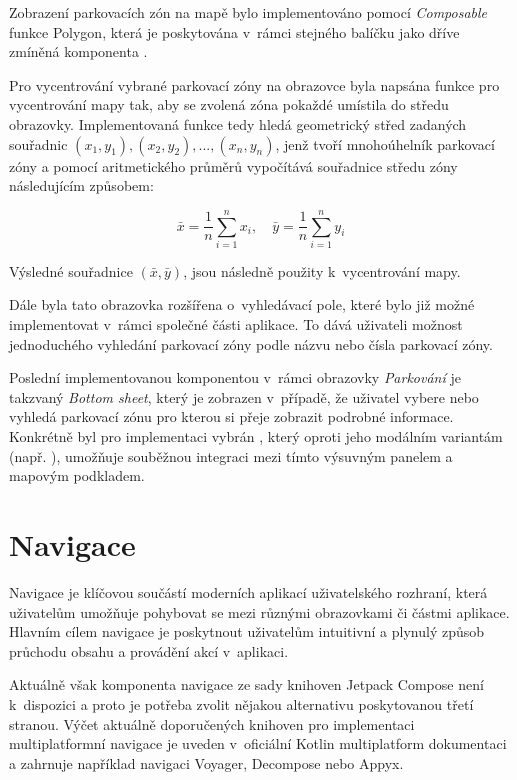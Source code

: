 Zobrazení parkovacích zón na mapě bylo implementováno pomocí \textit{Composable} funkce Polygon, která je poskytována v~rámci stejného balíčku 
jako dříve zmíněná komponenta .

Pro vycentrování vybrané parkovací zóny na obrazovce byla napsána funkce pro vycentrování mapy tak, aby se zvolená zóna pokaždé 
umístila do středu obrazovky. Implementovaná funkce tedy hledá geometrický střed zadaných souřadnic \( (x_1, y_1), (x_2, y_2), ..., (x_n, y_n)\), 
jenž tvoří mnohoúhelník parkovací zóny a pomocí aritmetického průměrů vypočítává souřadnice středu zóny následujícím způsobem:

\[
\bar{x} = \frac{1}{n} \sum_{i=1}^{n} x_i, \quad \bar{y} = \frac{1}{n} \sum_{i=1}^{n} y_i
\]

Výsledné souřadnice $(\bar{x},\bar{y})$, jsou následně použity k~vycentrování mapy.

\bigskip

Dále byla tato obrazovka rozšířena o~vyhledávací pole, které bylo již možné implementovat v~rámci společné části aplikace. 
To dává uživateli možnost jednoduchého vyhledání parkovací zóny podle názvu nebo čísla parkovací zóny.

Poslední implementovanou komponentou v~rámci obrazovky \textit{Parkování} je takzvaný \textit{Bottom sheet}, který je zobrazen v~případě, 
že uživatel vybere nebo vyhledá parkovací zónu pro kterou si přeje zobrazit podrobné informace. Konkrétně byl pro implementaci vybrán 
, který oproti jeho modálním variantám (např. ), umožňuje souběžnou integraci mezi tímto
 výsuvným panelem a mapovým podkladem.


\section{Navigace}
Navigace je klíčovou součástí moderních aplikací uživatelského rozhraní, která uživatelům umožňuje pohybovat se mezi různými obrazovkami či 
částmi aplikace. Hlavním cílem navigace je poskytnout uživatelům intuitivní a plynulý způsob průchodu obsahu a provádění akcí v~aplikaci. 

\medskip

Aktuálně však komponenta navigace ze sady knihoven Jetpack Compose není k~dispozici a proto je potřeba zvolit nějakou alternativu poskytovanou
třetí stranou. \cite{composeNav} Výčet aktuálně doporučených knihoven pro implementaci multiplatformní navigace je uveden v~oficiální Kotlin 
multiplatform dokumentaci a zahrnuje například navigaci Voyager, Decompose nebo Appyx. 

